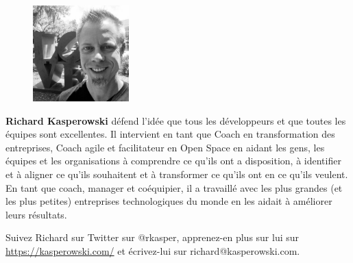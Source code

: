 \documentclass[paper=6in:9in,pagesize=pdftex,headinclude=on,footinclude=on,11pt]{scrbook}
\begin{document}
\begin{figure}
  \vspace{-2em}
  \begin{center}
    \includegraphics[width=10em]{rkasper_gs.png}
  \end{center}
  \vspace{-2em}
\end{figure}

\textbf{Richard Kasperowski} défend l'idée que tous les développeurs et que toutes les équipes sont excellentes. Il intervient
en tant que Coach en transformation des entreprises, Coach agile et facilitateur en Open Space en aidant les gens,
les équipes et les organisations à comprendre ce qu'ils ont a disposition, à identifier et à aligner ce qu'ils souhaitent
et à transformer ce qu'ils ont en ce qu'ils veulent. En tant que coach, manager et coéquipier, il a travaillé avec les
plus grandes (et les plus petites) entreprises technologiques du monde en les aidait à améliorer leurs résultats.

Suivez Richard sur Twitter sur @rkasper, apprenez-en plus sur lui sur \url{https://kasperowski.com/}
et écrivez-lui sur richard@kasperowski.com.
\end{document}

